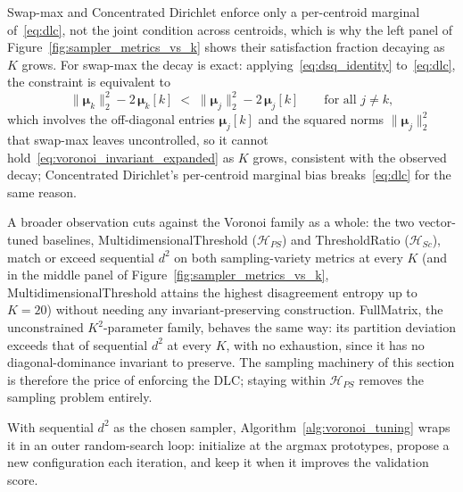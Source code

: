 Swap-max and Concentrated Dirichlet enforce only a per-centroid marginal of~\eqref{eq:dlc}, not the joint condition across centroids, which is why the left panel of Figure~\ref{fig:sampler_metrics_vs_k} shows their satisfaction fraction decaying as $K$ grows. For swap-max the decay is exact: applying~\eqref{eq:dsq_identity} to~\eqref{eq:dlc}, the constraint is equivalent to
\begin{equation}
    \|\boldsymbol{\mu}_k\|_2^2 - 2\,\boldsymbol{\mu}_k[k] \;<\; \|\boldsymbol{\mu}_j\|_2^2 - 2\,\boldsymbol{\mu}_j[k] \qquad \text{for all } j \neq k,
    \label{eq:voronoi_invariant_expanded}
\end{equation}
which involves the off-diagonal entries $\boldsymbol{\mu}_j[k]$ and the squared norms $\|\boldsymbol{\mu}_j\|_2^2$ that swap-max leaves uncontrolled, so it cannot hold~\eqref{eq:voronoi_invariant_expanded} as $K$ grows, consistent with the observed decay; Concentrated Dirichlet's per-centroid marginal bias breaks~\eqref{eq:dlc} for the same reason.

A broader observation cuts against the Voronoi family as a whole: the two vector-tuned baselines, MultidimensionalThreshold ($\mathcal{H}_{PS}$) and ThresholdRatio ($\mathcal{H}_{Sc}$), match or exceed sequential $d^2$ on both sampling-variety metrics at every $K$ (and in the middle panel of Figure~\ref{fig:sampler_metrics_vs_k}, MultidimensionalThreshold attains the highest disagreement entropy up to $K = 20$) without needing any invariant-preserving construction. FullMatrix, the unconstrained $K^2$-parameter family, behaves the same way: its partition deviation exceeds that of sequential $d^2$ at every $K$, with no exhaustion, since it has no diagonal-dominance invariant to preserve. The sampling machinery of this section is therefore the price of enforcing the DLC; staying within $\mathcal{H}_{PS}$ removes the sampling problem entirely.

With sequential $d^2$ as the chosen sampler, Algorithm~\ref{alg:voronoi_tuning} wraps it in an outer random-search loop: initialize at the argmax prototypes, propose a new configuration each iteration, and keep it when it improves the validation score.

